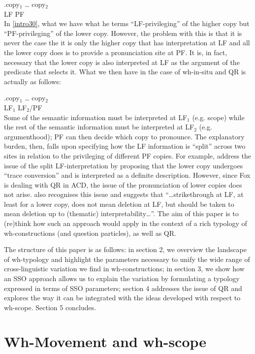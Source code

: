 \documentclass[charis]{glossa}
\begin{document}
\exg.\label{intro30}copy$_1$ {\dots} copy$_2$\\
   LF {} PF\\

In \ref{intro30}, what we have what he terms ``LF-privileging'' of the higher copy but ``PF-privileging'' of the lower copy. However, the problem with this is that it is never the case the it is only the higher copy that has interpretation at LF and all the lower copy does is to provide a pronunciation site at PF. It is, in fact, necessary that the lower copy is also interpreted at LF as the argument of the predicate that selects it. What we then have in the case of wh-in-situ and QR is actually as follows:

\exg.\label{intro40}copy$_1$ {\dots} copy$_2$\\
   LF$_1$ {} LF$_2$/PF\\

Some of the semantic information must be interpreted at LF$_1$ (e.g. scope) while the rest of the semantic information must be interpreted at LF$_2$ (e.g. argumenthood); PF can then decide which copy to pronounce. The explanatory burden, then, falls upon specifying how the LF information is ``split'' across two sites in relation to the privileging of different PF copies. For example, \cite{fox:2002} address the issue of the split LF-interpretation by proposing that the lower copy undergoes ``trace conversion'' and is interpreted as a definite description. However, since Fox is dealing with QR in ACD, the issue of the pronunciation of lower copies does not arise. \cite{bobaljik:2002} also recognises this issue and suggests that ``\dots strikethrough at LF, at least for a lower copy, does not mean deletion at LF, but should be taken to mean deletion up to (thematic) interpretability\dots ''. The aim of this paper is to (re)think how such an approach would apply in the context of a rich typology of wh-constructions (and question particles), as well as QR.

The structure of this paper is as follows: in section 2, we overview the landscape of wh-typology and highlight the parameters necessary to unify the wide range of cross-linguistic variation we find in wh-constructions; in section 3, we show how an SSO approach allows us to explain the variation by formulating a typology expressed in terms of SSO parameters; section 4 addresses the issue of QR and explores the way it can be integrated with the ideas developed with respect to wh-scope. Section 5 concludes.


\section{Wh-Movement and wh-scope}
\end{document}
